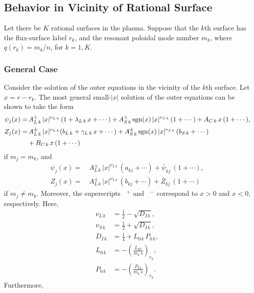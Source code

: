 \documentclass[12pt,prb,aps,notitlepage]{revtex4-1}
\begin{document}
\subsection{Behavior in Vicinity of  Rational Surface}\label{snus}
Let there be $K$ rational surfaces in the plasma. Suppose that the $k$th surface has the flux-surface label $r_k$, and the resonant
poloidal mode number $m_k$, where $q(r_k)=m_k/n$, for $k=1,K$.

\subsubsection{General Case}
Consider the solution of the outer equations  in the
vicinity of the $k$th surface. Let  $x=r-r_k$.  The most general small-$|x|$ solution of the outer equations
can be shown to take the form
\begin{align}\label{ex1}
\psi_{j}(x)=&\, A_{L\,k}^\pm \,|x|^{\nu_{L\,k}}\,(1+\lambda_{L\,k}\,x+\cdots) + A_{S\,k}^{\pm}\,{\rm sgn}(x)\,|x|^{\nu_{S\,k}}\,(1+\cdots) + A_{C\,k}\,x\,(1+\cdots),\\[0.5ex]
Z_{j}(x)=&\, A_{L\,k}^\pm\,|x|^{\nu_{L\,k}}(b_{L\,k}  + \gamma_{L\,k}\,x+\cdots) + A_{S\,k}^{\pm}\,{\rm sgn}(x)\,|x|^{\nu_{S\,k}}\,(b_{S\,k}+\cdots)\nonumber\\[0.5ex]
& + B_{C\,k}\,x\,(1+\cdots)\label{ex2}
\end{align}
if $m_j=m_k$, and 
\begin{align}\label{ex3}
\psi_{j}(x)=&\, A_{L\,k}^\pm\,|x|^{\nu_{L\,k}}\,(a_{kj}+\cdots)  + \bar{\psi}_{kj}\,(1+\cdots),\\[0.5ex]
Z_{j}(x)=&\, A_{L\,k}^\pm\,|x|^{\nu_{L\,k}}\,(b_{kj}+\cdots) + \bar{Z}_{kj}\,(1+\cdots)\label{ex4}
\end{align}
if $m_j\neq m_k$. Moreover, the superscripts $\phantom{x}^+$ and $\phantom{x}^-$ correspond  to $x>0$ and $x<0$, respectively. Here,
\begin{align}
\nu_{L\,k}&= \frac{1}{2}-\sqrt{D_{I\,k}},\\[0.5ex]
\nu_{S\,k} &=  \frac{1}{2}+\sqrt{D_{I\,k}},\\[0.5ex]
D_{I\,k} &= \frac{1}{4}+L_{0\,k}\,P_{0\,k},\\[0.5ex]
L_{0\,k} &=-\left(\frac{L_{kk}}{m_k\,s}\right)_{r_k},\\[0.5ex]
P_{0\,k} &= -\left(\frac{P_{kk}}{m_k\,s}\right)_{r_k}.
\end{align}
Furthermore, 
\end{document}
